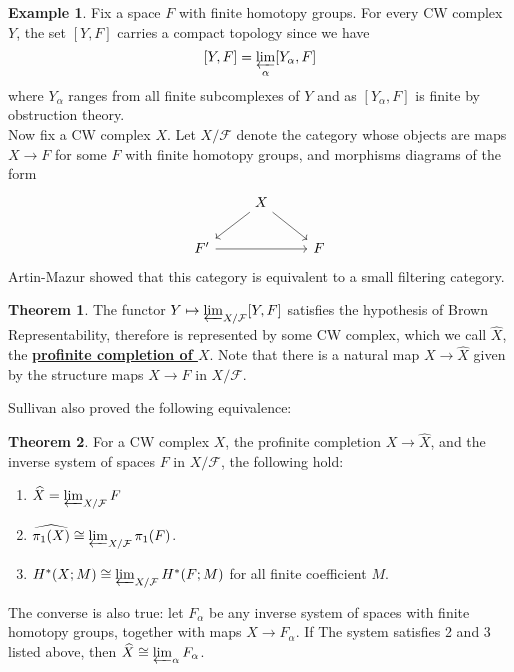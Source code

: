 \documentclass{article}
\theoremstyle{definition}
\newtheorem{theorem}{Theorem}[section]
\theoremstyle{definition}
\theoremstyle{definition}
\theoremstyle{definition}
\theoremstyle{definition}
\theoremstyle{definition}
\theoremstyle{definition}
\newtheorem{example}{Example}[theorem]
\begin{document}
\begin{tcolorbox}[colback=yellow!5!white,colframe=yellow!30!white]
\begin{example}
Fix a space $F$ with finite homotopy groups. For every CW complex $Y$, the set $[Y,F]$ carries a compact topology since we have 
\[[Y,F]=\varprojlim_{\alpha}[Y_{\alpha}, F]\]
where $Y_{\alpha}$ ranges from all finite subcomplexes of $Y$ and as $[Y_{\alpha}, F]$ is finite by obstruction theory. \\


Now fix a CW complex $X$. Let $X/\mathcal{F}$ denote the category whose objects are maps $X\to F$ for some $F$ with finite homotopy groups, and morphisms diagrams of the form 
\[\begin{tikzcd}
	& X \\
	{F'} && F
	\arrow[from=1-2, to=2-1]
	\arrow[from=1-2, to=2-3]
	\arrow[from=2-1, to=2-3]
\end{tikzcd}\]
Artin-Mazur showed that this category is equivalent to a small filtering category. 
\end{example}
\end{tcolorbox}


\begin{tcolorbox}[colback=red!5!white,colframe=red!30!white]
\begin{theorem}
The functor $Y\mapsto \varprojlim_{X/\mathcal{F}}[Y,F]$ satisfies the hypothesis of Brown Representability, therefore is represented by some CW complex, which we call $\widehat{X}$, the \underline{\textbf{profinite completion of $X$}}. Note that there is a natural map $X\to \widehat{X}$ given by the structure maps $X\to F$ in $X/\mathcal{F}$.
\end{theorem}
\end{tcolorbox}
Sullivan also proved the following equivalence:

\begin{tcolorbox}[colback=red!5!white,colframe=red!30!white]
\begin{theorem}
For a CW complex $X$, the profinite completion $X\to \widehat{X}$, and the inverse system of spaces ${F}$ in $X/\mathcal{F}$, the following hold:
\begin{enumerate}
	\item $\widehat{X}=\varprojlim_{X/\mathcal{F}}F$
	\item $\widehat{\pi_1(X)}\cong \varprojlim_{X/\mathcal{F}}\pi_1(F)$.
	\item $H^*(X;M)\cong \varprojlim_{X/\mathcal{F}}H^*(F;M)$ for all finite coefficient $M$.
\end{enumerate}
The converse is also true: let ${F_{\alpha}}$ be any inverse system of spaces with finite homotopy groups, together with maps $X\to F_{\alpha}$. If The system satisfies 2 and $3$ listed above, then $\widehat{X}\cong \varprojlim_{\alpha} F_{\alpha}$.
\end{theorem}
\end{tcolorbox}
\end{document}
